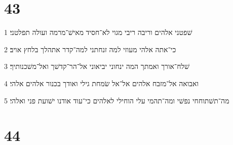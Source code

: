 \chapter{43}

\par 1 שׁפטני אלהים וריבה ריבי מגוי לא־חסיד מאישׁ־מרמה ועולה תפלטני׃
\par 2 כי־אתה אלהי מעוזי למה זנחתני למה־קדר אתהלך בלחץ אויב׃
\par 3 שׁלח־אורך ואמתך המה ינחוני יביאוני אל־הר־קדשׁך ואל־משׁכנותיך׃
\par 4 ואבואה אל־מזבח אלהים אל־אל שׂמחת גילי ואודך בכנור אלהים אלהי׃
\par 5 מה־תשׁתוחחי נפשׁי ומה־תהמי עלי הוחילי לאלהים כי־עוד אודנו ישׁועת פני ואלהי׃

\chapter{44}

